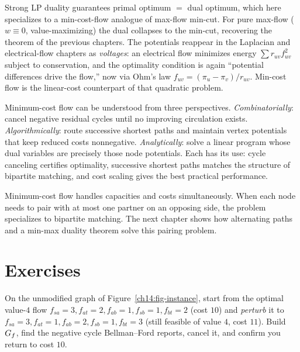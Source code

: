 \begin{connectionbox}
Strong LP duality guarantees primal optimum $=$ dual optimum, which here specializes to a min-cost-flow analogue of max-flow min-cut. For pure max-flow ($w\equiv 0$, value-maximizing) the dual collapses to the min-cut, recovering the theorem of the previous chapters. The potentials reappear in the Laplacian and electrical-flow chapters as \emph{voltages}: an electrical flow minimizes energy $\sum r_{uv} f_{uv}^2$ subject to conservation, and the optimality condition is again ``potential differences drive the flow,'' now via Ohm's law $f_{uv}=(\pi_u-\pi_v)/r_{uv}$. Min-cost flow is the linear-cost counterpart of that quadratic problem.
\end{connectionbox}

\begin{aestheticbox}
Minimum-cost flow can be understood from three perspectives. \emph{Combinatorially}: cancel negative residual cycles until no improving circulation exists. \emph{Algorithmically}: route successive shortest paths and maintain vertex potentials that keep reduced costs nonnegative. \emph{Analytically}: solve a linear program whose dual variables are precisely those node potentials. Each has its use: cycle canceling certifies optimality, successive shortest paths matches the structure of bipartite matching, and cost scaling gives the best practical performance.
\end{aestheticbox}

Minimum-cost flow handles capacities and costs simultaneously.
When each node needs to pair with at most one partner on an opposing side, the problem specializes to bipartite matching.
The next chapter shows how alternating paths and a min-max duality theorem solve this pairing problem.

\section{Exercises}
\label{ch14:exercises}

\begin{exercise}
On the unmodified graph of Figure~\ref{ch14:fig-instance}, start from the optimal value-$4$ flow $f_{sa}=3,f_{at}=2,f_{ab}=1,f_{sb}=1,f_{bt}=2$ (cost $10$) and \emph{perturb} it to $f_{sa}=3,f_{at}=1,f_{ab}=2,f_{sb}=1,f_{bt}=3$ (still feasible of value $4$, cost $11$). Build $G_f$, find the negative cycle Bellman--Ford reports, cancel it, and confirm you return to cost $10$.
\end{exercise}


